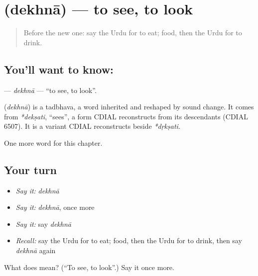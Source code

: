 \section[\texorpdfstring{\ur{دیکھنا} (dekhnā)}{دیکھنا (dekhnā)}]{ (dekhnā) — to see, to look}

\label{lesson:UR-C46-dekhna}



\begin{quote}
Before the new one: say the Urdu for to eat; food, then the Urdu for to drink.
\end{quote}

\subsection*{You'll want to know: }
\textbf{} — \emph{dekhnā} — \textquotedblleft{}to see, to look\textquotedblright{}.

\begin{cousinweb}
\textbf{} (\emph{dekhnā}) is a tadbhava, a word inherited and reshaped by sound change. It comes from \emph{*dekṣati}, \textquotedblleft{}sees\textquotedblright{}, a form CDIAL reconstructs from its descendants (CDIAL 6507). It is a variant CDIAL reconstructs beside \emph{*dṛkṣati}.
\end{cousinweb}

\begin{grammarlens}[title={What you've built}]
One more word for this chapter.
\end{grammarlens}

\subsection*{Your turn}
\begin{itemize}
\raggedright
  \item \emph{Say it:} \emph{dekhnā}
  \item \emph{Say it:} \emph{dekhnā}, once more
  \item \emph{Say it:} say \emph{dekhnā}
  \item \emph{Recall:} say the Urdu for to eat; food, then the Urdu for to drink, then say \emph{dekhnā} again
\end{itemize}

\begin{tcolorbox}[breakable,colback=teal!4,colframe=teal!35!black,title={Before you move on}]
What does  mean? (\textquotedblleft{}To see, to look\textquotedblright{}.) Say it once more.
\end{tcolorbox}
